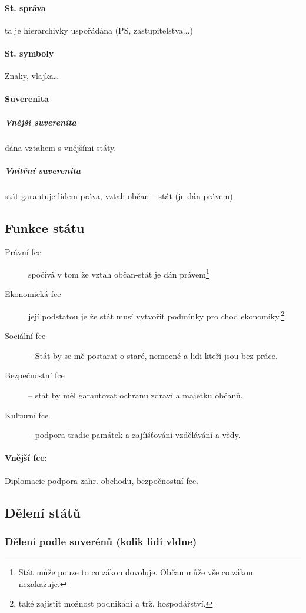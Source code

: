 \documentclass[10pt,a4paper,
twoside,%
]{report}
\begin{document}
\paragraph{St. správa} ta je hierarchivky uspořádána (PS, zastupitelstva...)

\paragraph{St. symboly} Znaky, vlajka\dots

\paragraph{Suverenita}
\subparagraph{Vnější suverenita} dána vztahem s vnějšími státy.
\subparagraph{Vnitřní suverenita} stát garantuje lidem práva, vztah občan -- stát (je dán právem)

\subsection{Funkce státu}
\begin{description}
\item[Právní fce] spočívá v tom že vztah občan-stát je dán právem\footnote{Stát může pouze to co zákon dovoluje. Občan může vše co zákon nezakazuje.}
\item[Ekonomická fce] její podstatou je že stát musí vytvořit podmínky pro chod ekonomiky.\footnote{také zajistit možnost podnikání a trž. hospodářství.}
\item[Sociální fce] -- Stát by se mě postarat o staré, nemocné a lidi kteří jsou bez práce.
\item[Bezpečnostní fce] -- stát by měl garantovat ochranu zdraví a majetku občanů.

\item[Kulturní fce]-- podpora tradic památek a zajíišťování vzdělávání a vědy.
\end{description}
 
\paragraph{Vnější fce:} Diplomacie podpora zahr. obchodu, bezpočnostní fce.

\subsection{Dělení států}
\subsubsection{Dělení podle suverénů (kolik lidí vldne)}
\end{document}
